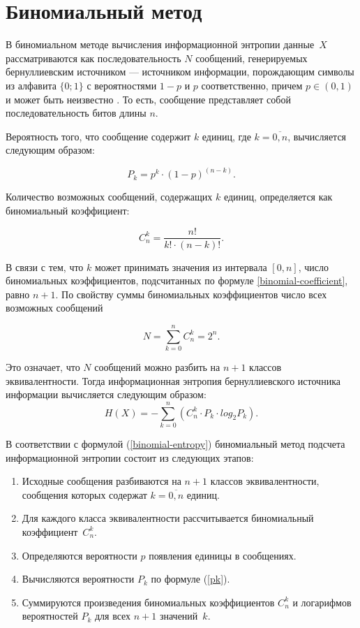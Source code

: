\section{Биномиальный метод}

В биномиальном методе вычисления информационной энтропии \cite{binomial-method} данные~$X$ рассматриваются как последовательность $N$ сообщений, генерируемых бернуллиевским источником --- источником информации, порождающим символы из алфавита $\{0; 1\}$ с вероятностями $1 - p$ и $p$ соответственно, причем $p \in (0, 1)$ и может быть неизвестно \cite{bernullie-source}. То есть, сообщение представляет собой последовательность битов длины $n$.

Вероятность того, что сообщение содержит $k$ единиц, где $k = \overline{0, n}$, вычисляется следующим образом:

\begin{equation}\label{pk}
	P_{k} = p^k \cdot (1 - p)^{(n - k)}.
\end{equation} 

Количество возможных сообщений, содержащих $k$ единиц, определяется как биномиальный коэффициент:

\begin{equation}\label{binomial-coefficient}
	C_{n}^k = \frac{n!}{k! \cdot (n - k)!}.
\end{equation}

В связи с тем, что $k$ может принимать значения из интервала $[0, n]$, число биномиальных коэффициентов, подсчитанных по формуле \ref{binomial-coefficient}, равно $n + 1$. По свойству суммы биномиальных коэффициентов число всех возможных сообщений

\begin{equation}
	N = \sum_{k = 0}^n C_{n}^k = 2^n.
\end{equation}

Это означает, что $N$ сообщений можно разбить на $n + 1$ классов эквивалентности. Тогда информационная энтропия бернуллиевского источника информации вычисляется следующим образом:
\begin{equation}\label{binomial-entropy}
	H(X) = -\sum_{k = 0}^n (C_{n}^k \cdot P_{k} \cdot log_{2}P_{k}).
\end{equation}

В соответствии с формулой (\ref{binomial-entropy}) биномиальный метод подсчета информационной энтропии состоит из следующих этапов:

\begin{enumerate}
	\item Исходные сообщения разбиваются на $n + 1$ классов эквивалентности, сообщения которых содержат $k = \overline{0, n}$ единиц.
	\item Для каждого класса эквивалентности рассчитывается биномиальный коэффициент~$C_{n}^k$.
	\item Определяются вероятности $p$ появления единицы в сообщениях.
	\item Вычисляются вероятности $P_{k}$ по формуле (\ref{pk}).
	\item Суммируются произведения биномиальных коэффициентов $C_{n}^k$ и логарифмов вероятностей $P_{k}$ для всех $n + 1$ значений~$k$.
\end{enumerate}

